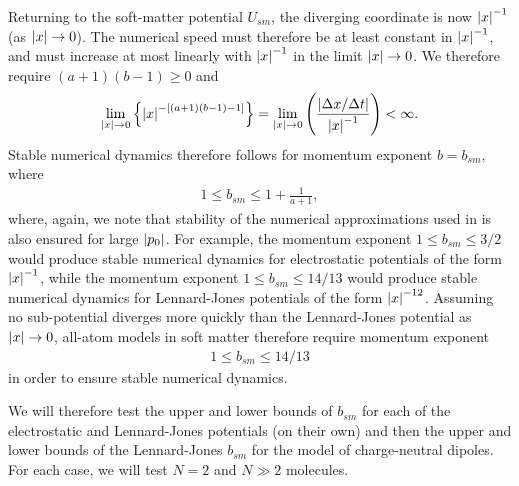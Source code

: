 \documentclass[a4paper]{article}
\begin{document}
Returning to the soft-matter potential $U_{sm}$, the diverging coordinate is now $\left| x \right|^{-1}$ (as $\left| x \right| \to 0$). The numerical speed must therefore be at least constant in $\left| x \right|^{-1}$, and must increase at most linearly with $\left| x \right|^{-1}$ in the limit $\left| x \right| \to 0$. We therefore require $(a + 1)(b - 1) \ge 0$ and
\begin{align}
\lim_{\left| x \right| \to 0} \left\{ \left| x \right|^{-[(a + 1)(b -1) - 1]} \right\} = \lim_{\left| x \right| \to 0} \left( \frac{\left| \Delta x / \Delta t \right|}{\left| x \right|^{-1}} \right) < \infty .
\end{align}
Stable numerical dynamics therefore follows for momentum exponent $b = b_{sm}$, where 
\begin{align}
1 \le b_{sm} \le 1 + \frac{1}{a + 1} ,
\end{align}
where, again, we note that stability of the numerical approximations used in  is also ensured for large $\left| p_0 \right|$. 
For example, the momentum exponent $1 \le b_{sm} \le 3 / 2$ would produce stable numerical dynamics for electrostatic potentials of the form $\left| x \right|^{-1}$, while the momentum exponent $1 \le b_{sm} \le 14 / 13$ would produce stable numerical dynamics for Lennard-Jones potentials of the form $\left| x \right|^{-12}$. Assuming no sub-potential diverges more quickly than the Lennard-Jones potential as $\left| x \right| \to 0$, all-atom models in soft matter therefore require momentum exponent 
\begin{align}
1 \le b_{sm} \le 14 / 13
\end{align}
in order to ensure stable numerical dynamics. 

We will therefore test the upper and lower bounds of $b_{sm}$ for each of the electrostatic and Lennard-Jones potentials (on their own) and then the upper and lower bounds of the Lennard-Jones $b_{sm}$ for the model of charge-neutral dipoles. For each case, we will test $N = 2$ and $N \gg 2$ molecules. 
\end{document}
